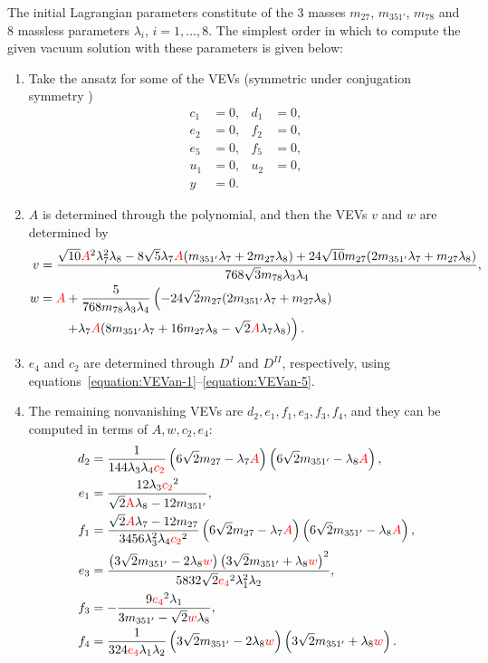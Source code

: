 \documentclass[a4paper,12pt]{article}
\def\RED{\textcolor{red}}
\def\non{\nonumber}
\begin{document}
The initial Lagrangian parameters constitute of the $3$ masses $m_{27}$, $m_{351'}$, $m_{78}$ and $8$ massless parameters $\lambda_i$, $i=1,\ldots,8$. The simplest order in which to compute the given vacuum solution with these parameters is given below:
\begin{enumerate}
\item Take the ansatz for some of the VEVs (symmetric under conjugation symmetry \cite{Bajc:2013qra})
\begin{align}
c_1&=0,&d_1&=0,\non\\
e_2&=0,&f_2&=0, \non\\
e_5&=0,&f_5&=0, \non\\
u_1&=0,&u_2&=0, \non\\
y&=0.&&
\end{align}
\item $A$ is determined through the polynomial, and then the VEVs $v$ and $w$ are determined by
\begin{align}
v&=\frac{\sqrt{10} \RED{A}^2 \lambda_7^2 \lambda_8-8 \sqrt{5} \lambda_7\RED{A} (m_{351'}\lambda_7 +2 m_{27}\lambda_8)+24 \sqrt{10} m_{27} (2 m_{351'} \lambda_7+m_{27} \lambda_8)}{768 \sqrt{3} m_{78} \lambda_3 \lambda_4},\\
w&=\RED{A}+\frac{5}{768 m_{78} \lambda_3 \lambda_4}\left(-24 \sqrt{2} m_{27} (2 m_{351'} \lambda_7+m_{27}
   \lambda_8)\right.\nonumber\\
&\qquad \left.+\lambda_7\RED{A}(8 m_{351'} \lambda_7+16 m_{27}
   \lambda_8-\sqrt{2} \RED{A} \lambda_7 \lambda_8)\right).
\end{align}
\item
$e_4$ and $c_2$ are determined through $D^{I}$ and $D^{II}$, respectively, using equations~\eqref{equation:VEVan-1}--\eqref{equation:VEVan-5}.
\item The remaining nonvanishing VEVs are $d_2,e_1,f_1,e_3,f_3,f_4$, and they can be computed in terms of $A,w,c_2,e_4$:
\begin{align}
d_2&=\frac{1}{144 \lambda_3 \lambda_4 \RED{c_2}}\left(6\sqrt{2}m_{27}-\lambda_7\RED{A}\right)\left(6\sqrt{2}m_{351'}-\lambda_8 \RED{A}\right),\label{equation:VEVan-1}\\
e_1&=\frac{12 \lambda_3 \RED{c_2}^2}{\sqrt{2} \text{\RED{A}} \lambda_8-12 m_{351'}},\\
f_1&=\frac{\sqrt{2} \RED{A}\lambda_7-12 m_{27}}{3456 \lambda_3^2 \lambda_4
   \RED{c_2}^2}\left(6\sqrt{2}m_{27}-\lambda_7\RED{A}\right)\left(6\sqrt{2}m_{351'}-\lambda_8 \RED{A}\right),\\
e_3&=\frac{\left(3 \sqrt{2} m_{351'}-2 \lambda_8 \RED{w}\right) \left(3 \sqrt{2} m_{351'}+\lambda_8\RED{w}\right)^2}{5832 \sqrt{2} \RED{e_4}^2 \lambda_1^2 \lambda_2},\\
f_3&=-\frac{9 \RED{e_4}^2 \lambda _1}{3 m_{351'}-\sqrt{2} \RED{w} \lambda _8},\\
f_4&=\frac{1}{324 \RED{e_4} \lambda _1 \lambda _2}\left(3 \sqrt{2} m_{351'}-2 \lambda_8 \RED{w}\right)\left(3 \sqrt{2} m_{351'}+\lambda_8\RED{w}\right).\label{equation:VEVan-5}
\end{align}
\end{enumerate}
\end{document}
